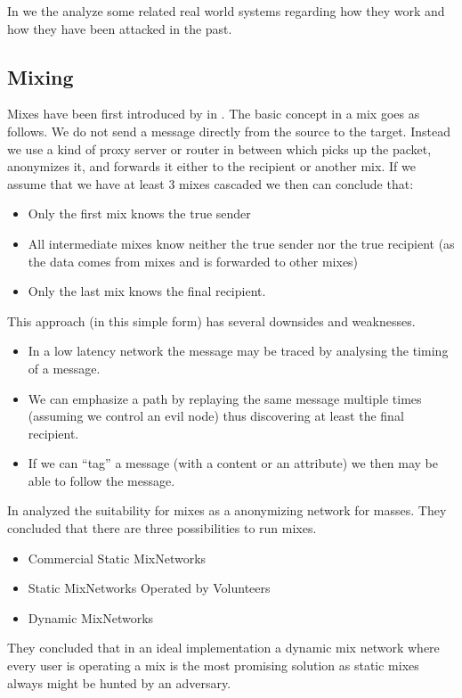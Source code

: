 In  we the analyze some related real world systems regarding how they work and how they have been attacked in the past.

\subsection{Mixing\label{sec:mixnets}}
Mixes have been first introduced by \cite{CHAUM1} in \citeyear{CHAUM1}. The basic concept in a mix goes as follows. We do not send a message directly from the source to the target. Instead we use a kind of proxy server or router in between which picks up the packet, anonymizes it, and forwards it either to the recipient or another mix. If we assume that we have at least 3 mixes cascaded we then can conclude that:
\begin{itemize}
	\item Only the first mix knows the true sender
	\item All intermediate mixes know neither the true sender nor the true recipient (as the data comes from mixes and is forwarded to other mixes) 
	\item Only the last mix knows the final recipient.
\end{itemize}

This approach (in this simple form) has several downsides and weaknesses.

\begin{itemize}
	\item In a low latency network the message may be traced by analysing the timing of a message.
	\item We can emphasize a path by replaying the same message multiple times (assuming we control an evil node) thus discovering at least the final recipient.
	\item If we can ``tag'' a message (with a content or an attribute) we then may be able to follow the message.
\end{itemize}

In \citeyear{RP03-1} \citeauthor{RP03-1} analyzed the suitability for mixes as a anonymizing network for masses. They concluded that there are three possibilities to run mixes.
\begin{itemize}
	\item Commercial Static MixNetworks
	\item Static MixNetworks Operated by Volunteers
	\item Dynamic MixNetworks
\end{itemize}
They concluded that in an ideal implementation a dynamic mix network where every user is operating a mix is the most promising solution as static mixes always might be hunted by an adversary.

